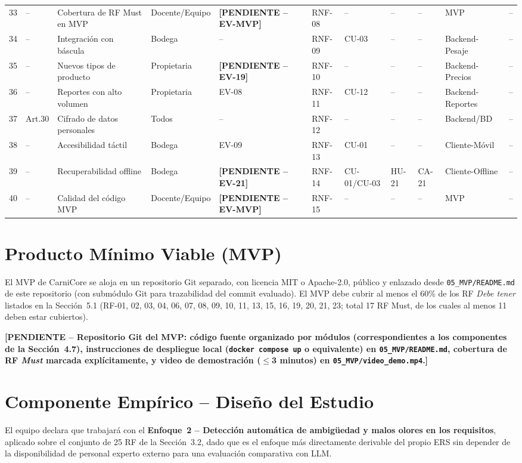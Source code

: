 \documentclass[11pt,a4paper]{article}
\newcommand{\PENDIENTE}[1]{\textcolor{pendiente}{\textbf{[PENDIENTE -- #1]}}}
\begin{document}
\begin{longtable}{|p{0.6cm}|p{1.6cm}|p{2.3cm}|p{1.7cm}|p{0.9cm}|p{0.9cm}|p{0.9cm}|p{0.9cm}|p{0.9cm}|p{1.5cm}|p{1.1cm}|}
33 & -- & Cobertura de RF Must en MVP & Docente/Equipo & \PENDIENTE{EV-MVP} & RNF-08 & -- & -- & -- & MVP & -- \\
34 & -- & Integración con báscula & Bodega & -- & RNF-09 & CU-03 & -- & -- & Backend-Pesaje & -- \\
35 & -- & Nuevos tipos de producto & Propietaria & \PENDIENTE{EV-19} & RNF-10 & -- & -- & -- & Backend-Precios & -- \\
36 & -- & Reportes con alto volumen & Propietaria & EV-08 & RNF-11 & CU-12 & -- & -- & Backend-Reportes & -- \\
37 & Art.30 & Cifrado de datos personales & Todos & -- & RNF-12 & -- & -- & -- & Backend/BD & -- \\
38 & -- & Accesibilidad táctil & Bodega & EV-09 & RNF-13 & CU-01 & -- & -- & Cliente-Móvil & -- \\
39 & -- & Recuperabilidad offline & Bodega & \PENDIENTE{EV-21} & RNF-14 & CU-01/CU-03 & HU-21 & CA-21 & Cliente-Offline & -- \\
40 & -- & Calidad del código MVP & Docente/Equipo & \PENDIENTE{EV-MVP} & RNF-15 & -- & -- & -- & MVP & -- \\
\hline
\end{longtable}
\normalsize

\section{Producto Mínimo Viable (MVP)}
El MVP de CarniCore se aloja en un repositorio Git separado, con licencia MIT o Apache-2.0, público y enlazado desde \texttt{05\_MVP/README.md} de este repositorio (con submódulo Git para trazabilidad del commit evaluado). El MVP debe cubrir al menos el 60\% de los RF \textit{Debe tener} listados en la Sección~5.1 (RF-01, 02, 03, 04, 06, 07, 08, 09, 10, 11, 13, 15, 16, 19, 20, 21, 23; total 17 RF Must, de los cuales al menos 11 deben estar cubiertos).

\PENDIENTE{Repositorio Git del MVP: código fuente organizado por módulos (correspondientes a los componentes de la Sección~4.7), instrucciones de despliegue local (\texttt{docker compose up} o equivalente) en \texttt{05\_MVP/README.md}, cobertura de RF \textit{Must} marcada explícitamente, y video de demostración ($\leq$3 minutos) en \texttt{05\_MVP/video\_demo.mp4}.}

\section{Componente Empírico -- Diseño del Estudio}
El equipo declara que trabajará con el \textbf{Enfoque~2 -- Detección automática de ambigüedad y malos olores en los requisitos}, aplicado sobre el conjunto de 25 RF de la Sección~3.2, dado que es el enfoque más directamente derivable del propio ERS sin depender de la disponibilidad de personal experto externo para una evaluación comparativa con LLM.
\end{document}
